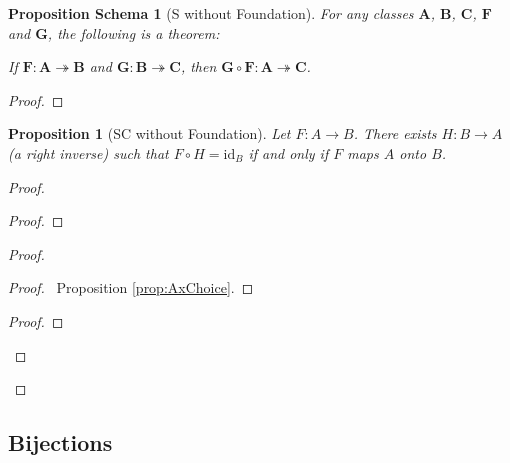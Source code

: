 \documentclass{book}
\let\qed\relax
\newtheorem{prop}[ax]{Proposition}
\newtheorem{props}[ax]{Proposition Schema}
\theoremstyle{definition}
\newcommand{\id}[1]{\ensuremath{\mathrm{id}_{#1}}}
\begin{document}
\begin{props}[S without Foundation]
\label{prop:compsurj}
For any classes $\mathbf{A}$, $\mathbf{B}$, $\mathbf{C}$, $\mathbf{F}$ and $\mathbf{G}$, the following is a theorem:

If $\mathbf{F} : \mathbf{A} \twoheadrightarrow \mathbf{B}$ and $\mathbf{G} : \mathbf{B} \twoheadrightarrow \mathbf{C}$, then $\mathbf{G} \circ \mathbf{F} : \mathbf{A} \twoheadrightarrow \mathbf{C}$.
\end{props}

\begin{proof}
\pf
{}
\qed
\end{proof}

\begin{prop}[SC without Foundation]
Let $F : A \rightarrow B$. There exists $H : B \rightarrow A$ (a \emph{right inverse}) such that $F \circ H = \id{B}$ if and only if $F$ maps $A$ onto $B$.
\end{prop}

\begin{proof}
\pf
{}
\begin{proof}
\end{proof}
\begin{proof}
	\begin{proof}
		\pf\ Proposition \ref{prop:AxChoice}.
	\end{proof}
	\step{d}{$F \circ H = \id{B}$}
	\begin{proof}
	\end{proof}
\end{proof}
\qed
\end{proof}

\subsection{Bijections}
\end{document}

